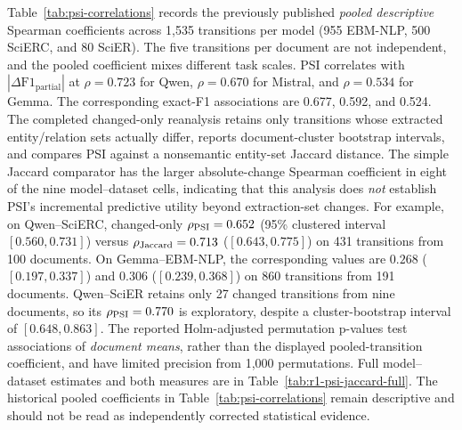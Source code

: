 \documentclass[fleqn,10pt]{wlscirep-authoryear}
\begin{document}
Table~\ref{tab:psi-correlations} records the previously published \emph{pooled
descriptive} Spearman coefficients across 1,535 transitions per model (955
EBM-NLP, 500 SciERC, and 80 SciER). The five transitions per document are not
independent, and the pooled coefficient mixes different task scales. PSI correlates with
$|\Delta \mathrm{F1}_{\mathrm{partial}}|$ at $\rho=0.723$ for Qwen,
$\rho=0.670$ for Mistral, and $\rho=0.534$ for Gemma. The corresponding exact-F1
associations are 0.677, 0.592, and 0.524. %
The completed changed-only reanalysis retains only transitions whose extracted
entity/relation sets actually differ, reports document-cluster bootstrap intervals,
and compares PSI against a nonsemantic entity-set Jaccard distance. The simple
Jaccard comparator has the larger absolute-change Spearman coefficient in eight
of the nine model--dataset cells, indicating that this analysis does \emph{not}
establish PSI's incremental predictive utility beyond extraction-set changes.
For example, on Qwen--SciERC, changed-only $\rho_{\rm PSI}=0.652$
(95\% clustered interval $[0.560,0.731]$) versus
$\rho_{\rm Jaccard}=0.713$ ($[0.643,0.775]$) on 431 transitions from
100 documents. On Gemma--EBM-NLP, the corresponding values are $0.268$
($[0.197,0.337]$) and $0.306$ ($[0.239,0.368]$) on 860 transitions from
191 documents. Qwen--SciER retains only 27 changed transitions from nine
documents, so its $\rho_{\rm PSI}=0.770$ is exploratory, despite a
cluster-bootstrap interval of $[0.648,0.863]$. The reported Holm-adjusted
permutation p-values test associations of \emph{document means}, rather than
the displayed pooled-transition coefficient, and have limited precision from
1,000 permutations. Full model--dataset estimates and both measures are in
Table~\ref{tab:r1-psi-jaccard-full}. The historical pooled coefficients in
Table~\ref{tab:psi-correlations} remain descriptive and should not be read
as independently corrected statistical evidence.
\end{document}
